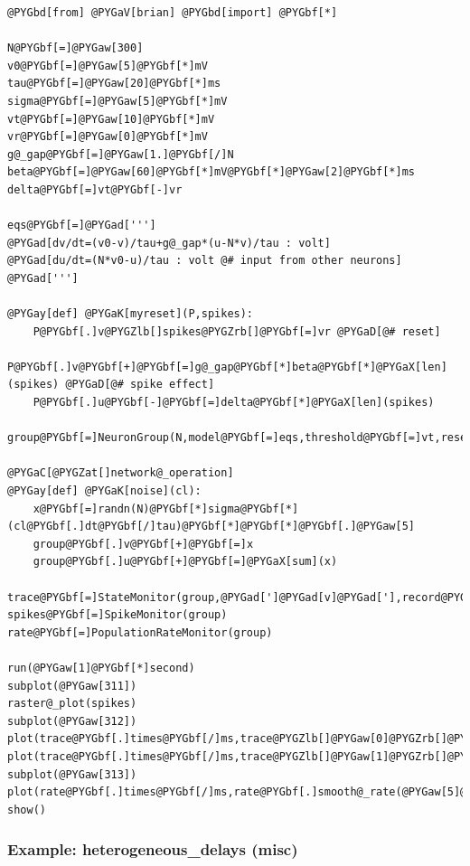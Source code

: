 \documentclass[letterpaper,10pt,english]{manual}
\begin{document}
\begin{Verbatim}[commandchars=@\[\]]
@PYGbd[from] @PYGaV[brian] @PYGbd[import] @PYGbf[*]

N@PYGbf[=]@PYGaw[300]
v0@PYGbf[=]@PYGaw[5]@PYGbf[*]mV
tau@PYGbf[=]@PYGaw[20]@PYGbf[*]ms
sigma@PYGbf[=]@PYGaw[5]@PYGbf[*]mV
vt@PYGbf[=]@PYGaw[10]@PYGbf[*]mV
vr@PYGbf[=]@PYGaw[0]@PYGbf[*]mV
g@_gap@PYGbf[=]@PYGaw[1.]@PYGbf[/]N
beta@PYGbf[=]@PYGaw[60]@PYGbf[*]mV@PYGbf[*]@PYGaw[2]@PYGbf[*]ms
delta@PYGbf[=]vt@PYGbf[-]vr

eqs@PYGbf[=]@PYGad[''']
@PYGad[dv/dt=(v0-v)/tau+g@_gap*(u-N*v)/tau : volt]
@PYGad[du/dt=(N*v0-u)/tau : volt @# input from other neurons]
@PYGad[''']

@PYGay[def] @PYGaK[myreset](P,spikes):
    P@PYGbf[.]v@PYGZlb[]spikes@PYGZrb[]@PYGbf[=]vr @PYGaD[@# reset]
    P@PYGbf[.]v@PYGbf[+]@PYGbf[=]g@_gap@PYGbf[*]beta@PYGbf[*]@PYGaX[len](spikes) @PYGaD[@# spike effect]
    P@PYGbf[.]u@PYGbf[-]@PYGbf[=]delta@PYGbf[*]@PYGaX[len](spikes)

group@PYGbf[=]NeuronGroup(N,model@PYGbf[=]eqs,threshold@PYGbf[=]vt,reset@PYGbf[=]myreset)

@PYGaC[@PYGZat[]network@_operation]
@PYGay[def] @PYGaK[noise](cl):
    x@PYGbf[=]randn(N)@PYGbf[*]sigma@PYGbf[*](cl@PYGbf[.]dt@PYGbf[/]tau)@PYGbf[*]@PYGbf[*]@PYGbf[.]@PYGaw[5]
    group@PYGbf[.]v@PYGbf[+]@PYGbf[=]x
    group@PYGbf[.]u@PYGbf[+]@PYGbf[=]@PYGaX[sum](x)

trace@PYGbf[=]StateMonitor(group,@PYGad[']@PYGad[v]@PYGad['],record@PYGbf[=]@PYGZlb[]@PYGaw[0],@PYGaw[1]@PYGZrb[])
spikes@PYGbf[=]SpikeMonitor(group)
rate@PYGbf[=]PopulationRateMonitor(group)

run(@PYGaw[1]@PYGbf[*]second)
subplot(@PYGaw[311])
raster@_plot(spikes)
subplot(@PYGaw[312])
plot(trace@PYGbf[.]times@PYGbf[/]ms,trace@PYGZlb[]@PYGaw[0]@PYGZrb[]@PYGbf[/]mV)
plot(trace@PYGbf[.]times@PYGbf[/]ms,trace@PYGZlb[]@PYGaw[1]@PYGZrb[]@PYGbf[/]mV)
subplot(@PYGaw[313])
plot(rate@PYGbf[.]times@PYGbf[/]ms,rate@PYGbf[.]smooth@_rate(@PYGaw[5]@PYGbf[*]ms)@PYGbf[/]Hz)
show()
\end{Verbatim}

\resetcurrentobjects
\hypertarget{--doc-examples-misc_heterogeneous_delays}{}

\hypertarget{index-66}{}\subsubsection{Example: heterogeneous\_delays (misc)}
\end{document}
